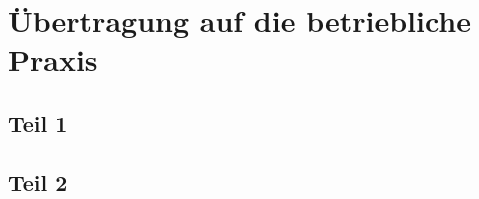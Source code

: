 \section{Übertragung auf die betriebliche Praxis}
\label{sec:Praxis}
\blindtext

\subsection{Teil 1}
\label{subsec:Teil1}
\blindtext

\subsection{Teil 2}
\label{subsec:Teil2}
\blindtext
